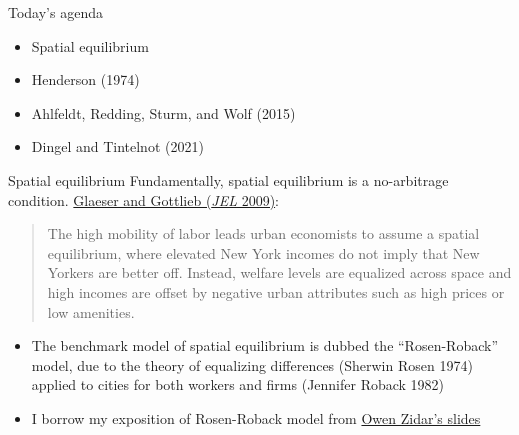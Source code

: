 \documentclass[10pt,notes=hide]{beamer}
\begin{document}
\begin{frame}{Today's agenda}
\begin{itemize}
\item Spatial equilibrium
\item Henderson (1974)
\item Ahlfeldt, Redding, Sturm, and Wolf (2015)
\item Dingel and Tintelnot (2021)
\end{itemize}
\end{frame}
\begin{frame}{Spatial equilibrium}
Fundamentally, spatial equilibrium is a no-arbitrage condition.
\href{https://www.aeaweb.org/articles?id=10.1257/jel.47.4.983}{Glaeser and Gottlieb (\textit{JEL} 2009)}:
\begin{quote}
The high mobility of labor leads urban economists to assume a spatial equilibrium, where elevated New York incomes do not imply that New Yorkers are better off. Instead, welfare levels are equalized across space and high incomes are offset by negative urban attributes such as high prices or low amenities.
\end{quote}
\begin{itemize}
	\item The benchmark model of spatial equilibrium is dubbed the ``Rosen-Roback'' model, due to the theory of equalizing differences (Sherwin Rosen 1974) applied to cities for both workers and firms (Jennifer Roback 1982)
	\item I borrow my exposition of Rosen-Roback model from \href{https://scholar.princeton.edu/sites/default/files/zidar/files/zidar_eco524_s2020_lec2.pdf}{Owen Zidar's slides}
\end{itemize}
\end{frame}
\end{document}
